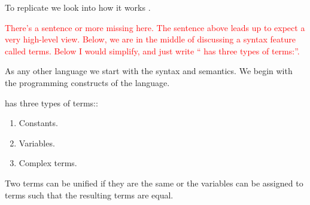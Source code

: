 \documentclass[thesis-solanki.tex]{subfiles}
\begin{document}
To replicate  we look into how it works \cite{webiste:learnprolognow}.

\textcolor{red}{There's a sentence or more missing here. The sentence above leads up to expect a very
  high-level view.  Below, we are in the middle of discussing a syntax feature called terms.
  Below I would simplify, and just write `` has three types of terms:''.
}

As any other language
we start with the syntax and semantics. We begin with the programming constructs of the language.

 has three types of terms::
\begin{enumerate}
\item Constants.

\item Variables.

\item Complex terms.
\end{enumerate}

Two terms can be unified if they are the same or the variables can be assigned to terms such that the resulting
terms are equal.
\end{document}
